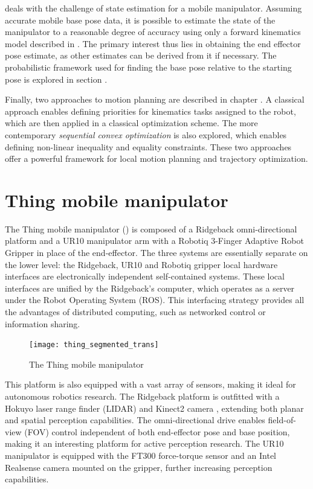 \documentclass[times, utf8, diplomski, english]{fer}
\begin{document}
 deals with the challenge of state estimation for a mobile manipulator.
Assuming accurate mobile base pose data, it is possible to estimate the state of the manipulator to a reasonable degree of accuracy using only a forward kinematics model described in .
The primary interest thus lies in obtaining the end effector pose estimate, as other estimates can be derived from it if necessary.
The probabilistic framework used for finding the base pose relative to the starting pose is explored in section .

Finally, two approaches to motion planning are described in chapter .
A classical approach enables defining priorities for kinematics tasks assigned to the robot, which are then applied in a classical optimization scheme.
The more contemporary \textit{sequential convex optimization} is also explored, which enables defining non-linear inequality and equality constraints.
These two approaches offer a powerful framework for local motion planning and trajectory optimization.

\chapter{Thing mobile manipulator}\label{chapter:thing}
The Thing mobile manipulator () is composed of a Ridgeback omni-directional platform and a UR10 manipulator arm with a Robotiq 3-Finger Adaptive Robot Gripper in place of the end-effector.
The three systems are essentially separate on the lower level: the Ridgeback, UR10 and Robotiq gripper local hardware interfaces are electronically independent self-contained systems.
These local interfaces are unified by the Ridgeback's computer, which operates as a server under the Robot Operating System (ROS).
This interfacing strategy provides all the advantages of distributed computing, such as networked control or information sharing.
\begin{figure}[h]
\centering
\texttt{[image: thing\_segmented\_trans]}
\caption{The Thing mobile manipulator}
\label{figure:thing}
\end{figure}
This platform is also equipped with a vast array of sensors, making it ideal for autonomous robotics research.
The Ridgeback platform is outfitted with a Hokuyo laser range finder (LIDAR) and Kinect2 camera , extending both planar and spatial perception capabilities.
The omni-directional drive enables field-of-view (FOV) control independent of both end-effector pose and base position, making it an interesting platform for active perception research.
The UR10 manipulator is equipped with the FT300 force-torque sensor and an Intel Realsense camera mounted on the gripper, further increasing perception capabilities.
\end{document}
